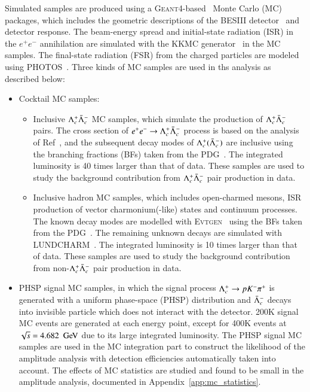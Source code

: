 Simulated samples are produced using a \textsc{Geant4}-based~\cite{GEANT4:2002zbu} Monte Carlo (MC) packages, which includes the geometric descriptions of the BESIII detector~\cite{Liang:2009zzb,Huang:2022wuo} and detector response. The beam-energy spread and initial-state radiation (ISR) in the $e^+e^-$ annihilation are simulated with the \textsc{KKMC} generator~\cite{Jadach:2000ir} in the MC samples. The final-state radiation (FSR) from the charged particles are modeled using \textsc{PHOTOS}~\cite{Richter-Was:1992hxq}. Three kinds of MC samples are used in ths analysis as described below:
\begin{itemize}
    \item Cocktail MC samples:
    \begin{itemize}
        \item Inclusive $\Lambda_{c}^{+}\bar{\Lambda}_{c}^{-}$ MC samples, which simulate the production of $\Lambda_{c}^{+}\bar{\Lambda}_{c}^{-}$ pairs. The cross section of $e^+e^- \rightarrow \Lambda_{c}^{+}\bar{\Lambda}_{c}^{-}$ process is based on the analysis of Ref~\cite{Wang:memo}, and the subsequent decay modes of $\Lambda_{c}^{+}(\bar{\Lambda}_{c}^{-})$ are inclusive using the branching fractions (BFs) taken from the PDG~\cite{Workman:2022ynf}. The integrated luminosity is 40 times larger than that of data. These samples are used to study the background contribution from $\Lambda_{c}^{+}\bar{\Lambda}_{c}^{-}$ pair production in data. 
        \item Inclusive hadron MC samples, which includes open-charmed mesons, ISR production of vector charmonium(-like) states and continuum processes. The known decay modes are modelled with \textsc{Evtgen}~\cite{Lange:2001uf,Ping:2008zz} using the BFs taken from the PDG~\cite{Workman:2022ynf}. The remaining unknown decays are simulated with \textsc{LUNDCHARM}~\cite{Chen:2000tv,Yang:2014vra}. The integrated luminosity is 10 times larger than that of data. These samples are used to study the background contribution from non-$\Lambda_{c}^{+}\bar{\Lambda}_{c}^{-}$ pair production in data. 
    \end{itemize}
    \item PHSP signal MC samples, in which the signal process $\Lambda_{c}^{+} \rightarrow pK^-\pi^+$ is generated with a uniform phase-space (PHSP) distribution and $\bar{\Lambda}_{c}^{-}$ decays into invisible particle which does not interact with the detector. 200K signal MC events are generated at each energy point, except for 400K events at $\sqrt{s} = 4.682~\gev$ due to its large integrated luminosity. The PHSP signal MC samples are used in the MC integration part to construct the likelihood of the amplitude analysis with detection efficiencies automatically taken into account. The effects of MC statistics are studied and found to be small in the amplitude analysis, documented in Appendix~\ref{app:mc_statistics}.
\end{itemize}
